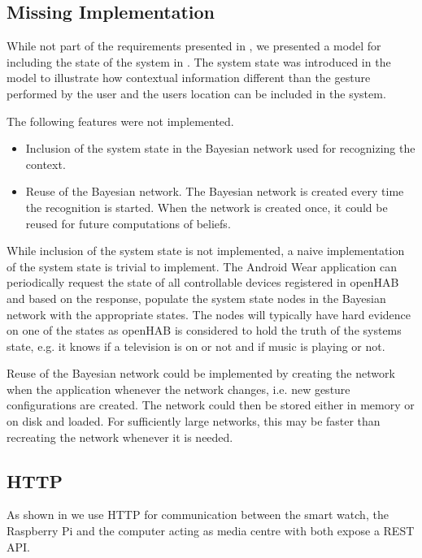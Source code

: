 \subsection{Missing Implementation}

While not part of the requirements presented in , we presented a model for including the state of the system in . The system state was introduced in the model to illustrate how contextual information different than the gesture performed by the user and the users location can be included in the system.

The following features were not implemented.

\begin{itemize}
\item Inclusion of the system state in the Bayesian network used for recognizing the context.
\item Reuse of the Bayesian network. The Bayesian network is created every time the recognition is started. When the network is created once, it could be reused for future computations of beliefs.
\end{itemize}

While inclusion of the system state is not implemented, a naive implementation of the system state is trivial to implement. The Android Wear application can periodically request the state of all controllable devices registered in openHAB and based on the response, populate the system state nodes in the Bayesian network with the appropriate states. The nodes will typically have hard evidence on one of the states as openHAB is considered to hold the truth of the systems state, e.g. it knows if a television is on or not and if music is playing or not.

Reuse of the Bayesian network could be implemented by creating the network when the application whenever the network changes, i.e. new gesture configurations are created. The network could then be stored either in memory or on disk and loaded. For sufficiently large networks, this may be faster than recreating the network whenever it is needed.

\subsection{HTTP}

As shown in  we use HTTP for communication between the smart watch, the Raspberry Pi and the computer acting as media centre with both expose a REST API.

